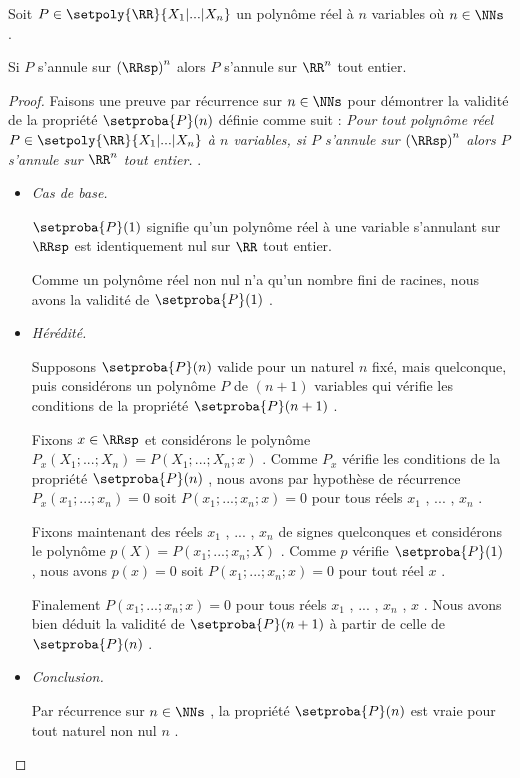 \medskip

\begin{fact} \label{poly-nullity-pos}
	Soit $P \in \setpoly{\RR}{X_1 | ... | X_n}$ un polynôme réel à $n$ variables où $n \in \NNs$ .
	
	\smallskip
	
	Si $P$ s'annule sur $\left( \RRsp \right)^n$ alors $P$ s'annule sur $\RR^n$ tout entier. 
\end{fact}


\begin{proof}
	Faisons une preuve par récurrence sur $n \in \NNs$ pour démontrer la validité de la propriété $\setproba{P}(n)$ définie comme suit :
	\emph{\og 
		Pour tout polynôme réel $P \in \setpoly{\RR}{X_1 | ... | X_n}$ à $n$ variables,
		si $P$ s'annule sur $\left( \RRsp \right)^n$ alors $P$ s'annule sur $\RR^n$ tout entier. 
	\fg}.

	\begin{itemize}[label=\small\textbullet]
		\item \emph{Cas de base.}
	
		\noindent
		$\setproba{P}(1)$ signifie qu'un polynôme réel à une variable s'annulant sur $\RRsp$ est identiquement nul sur $\RR$ tout entier.
		
		\smallskip
		\noindent
		Comme un polynôme réel non nul n'a qu'un nombre fini de racines, nous avons la validité de $\setproba{P}(1)$ .


		\medskip
		\item \emph{Hérédité.}
	
		\noindent
		Supposons $\setproba{P}(n)$ valide pour un naturel $n$ fixé, mais quelconque, puis considérons un polynôme $P$ de $(n + 1)$ variables qui vérifie les conditions de la propriété $\setproba{P}(n + 1)$ .
	
		\smallskip
		\noindent
		Fixons $x \in \RRsp$ et considérons le polynôme $P_x(X_1 ; ... ; X_n) = P(X_1 ; ... ; X_n ; x)$ .
		Comme $P_x$  vérifie les conditions de la propriété $\setproba{P}(n)$ ,
		nous avons par hypothèse de récurrence 
		$P_x(x_1 ; ... ; x_n) = 0$ soit $P(x_1 ; ... ; x_n ; x) = 0$ pour tous réels $x_1$ , ... , $x_n$ .
	
		\smallskip
		\noindent
		Fixons maintenant des réels $x_1$ , ... , $x_n$ de signes quelconques et considérons le polynôme $p(X) = P(x_1 ; ... ; x_n ; X)$ .
		Comme $p$ vérifie $\setproba{P}(1)$ , nous avons $p(x) = 0$ soit $P(x_1 ; ... ; x_n ; x) = 0$ pour tout réel $x$ .
	
		\smallskip
		\noindent
		Finalement $P(x_1 ; ... ; x_n ; x) = 0$ pour tous réels $x_1$ , ... , $x_n$ , $x$ .
		Nous avons bien déduit la validité de $\setproba{P}(n+1)$ à partir de celle de $\setproba{P}(n)$ .


	\medskip
	\item \emph{Conclusion.}
	
	\smallskip
	\noindent
	Par récurrence sur $n \in \NNs$ , la propriété $\setproba{P}(n)$ est vraie pour tout naturel non nul $n$ .
	\end{itemize}
\end{proof}


